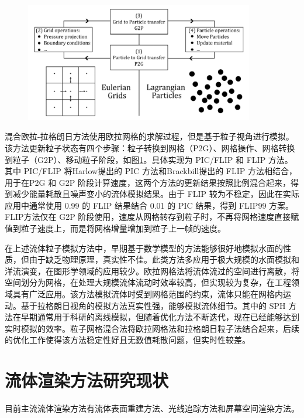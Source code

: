 \begin{figure}[ht]
 \centering
 \includegraphics[width=10cm]{image/PIC.png}
 \label{fig:PIC}
\end{figure}

\indent 混合欧拉-拉格朗日方法使用欧拉网格的求解过程，但是基于粒子视角进行模拟。该方法更新粒子状态有四个步骤：粒子转换到网格（P2G）、网格操作、网格转换到粒子（G2P）、移动粒子阶段，如图\ref{fig:PIC}。具体实现为 PIC/FLIP 和 FLIP 方法。其中 PIC/FLIP 将Harlow提出的 PIC 方法\cite{harlow1962particle}和Brackbill提出的 FLIP 方法\cite{brackbill1986flip}相结合，用于在P2G 和 G2P 阶段计算速度，这两个方法的更新结果按照比例混合起来，得到减少能量耗散且噪声变小的流体模拟结果。由于 FLIP 较为不稳定，因此在实际应用中通常使用 0.99 的 FLIP 结果结合 0.01 的 PIC 结果，得到 FLIP99 方案。FLIP方法\cite{zhu2005animating}仅在 G2P 阶段使用，速度从网格转存到粒子时，不再将网格速度直接赋值到粒子速度上，而是将网格增量增加到粒子上一帧的速度。

在上述流体粒子模拟方法中，早期基于数学模型的方法能够很好地模拟水面的性质，但由于缺乏物理原理，真实性不佳。此类方法多应用于极大规模的水面模拟\cite{abbaszadeh2020upwind}和洋流演变，在图形学领域的应用较少。欧拉网格法将流体流过的空间进行离散，将空间划分为网格，在处理大规模流体流动时效率较高，但实现较为复杂，在工程领域具有广泛应用‌\cite{wudeyang2020fluid}。该方法模拟流体时受到网格范围的约束，流体只能在网格内运动。基于拉格朗日视角的模拟方法真实性强，能够模拟流体细节。其中的 SPH 方法在早期通常用于科研的离线模拟，但随着优化方法不断迭代，现在已经能够达到实时模拟的效率。粒子网格混合法将欧拉网格法和拉格朗日粒子法结合起来，后续的优化工作使得该方法稳定性好且无数值耗散问题，但实时性较差\cite{wudeyang2020fluid}。


\section{流体渲染方法研究现状}

目前主流流体渲染方法有流体表面重建方法、光线追踪方法和屏幕空间渲染方法。

